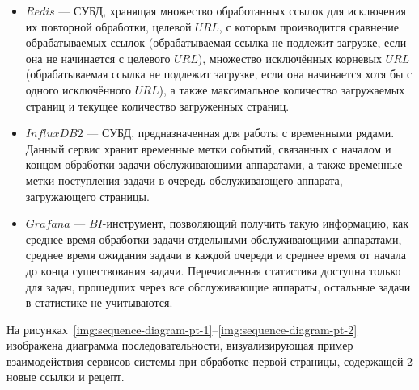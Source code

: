 \begin{itemize}
	\item $Redis$ --- СУБД, хранящая множество обработанных ссылок для исключения их повторной обработки, целевой $URL$, с которым производится сравнение обрабатываемых ссылок (обрабатываемая ссылка не подлежит загрузке, если она не начинается с целевого $URL$), множество исключённых корневых $URL$ (обрабатываемая ссылка не подлежит загрузке, если она начинается хотя бы с одного исключённого $URL$), а также максимальное количество загружаемых страниц и текущее количество загруженных страниц.
	\item $InfluxDB2$ --- СУБД, предназначенная для работы с временными рядами. Данный сервис хранит временные метки событий, связанных с началом и концом обработки задачи обслуживающими аппаратами, а также временные метки поступления задачи в очередь обслуживающего аппарата, загружающего страницы.
	\item $Grafana$ --- $BI$-инструмент, позволяющий получить такую информацию, как среднее время обработки задачи отдельными обслуживающими аппаратами, среднее время ожидания задачи в каждой очереди и среднее время от начала до конца существования задачи. Перечисленная статистика доступна только для задач, прошедших через все обслуживающие аппараты, остальные задачи в статистике не учитываются.
\end{itemize}


\clearpage

На рисунках~\ref{img:sequence-diagram-pt-1}--\ref{img:sequence-diagram-pt-2} изображена диаграмма последовательности, визуализирующая пример взаимодействия сервисов системы при обработке первой страницы, содержащей 2 новые ссылки и рецепт.

